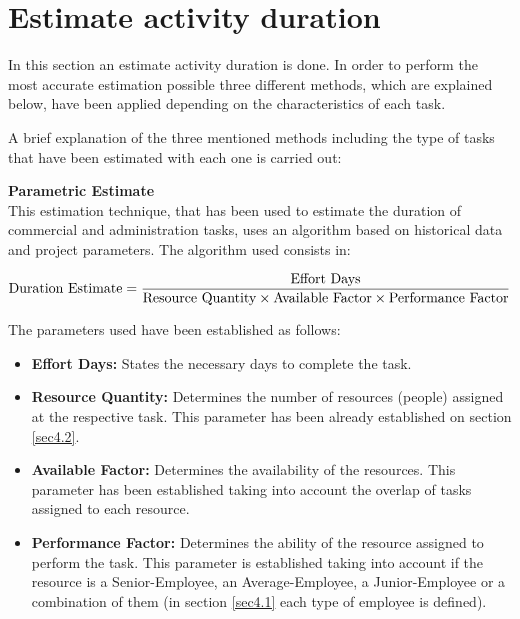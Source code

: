 \chapter{Estimate activity duration}

In this section an estimate activity duration is done. In order to perform the most accurate estimation possible three different methods, which are explained below, have been applied depending on the characteristics of each task. 

A brief explanation of the three mentioned methods including the type of tasks that have been estimated with each one is carried out:

\textbf{Parametric Estimate} \\
This estimation technique, that has been used to estimate the duration of commercial and administration tasks, uses an algorithm based on historical data and project parameters. The algorithm used consists in: 

\begin{equation}
\centering
\notag \text{Duration Estimate}=\frac{\text{Effort Days}}{\text{Resource Quantity} \times \text{Available Factor} \times \text{Performance Factor}}
\end{equation}

The parameters used have been established as follows:

\begin{itemize}
	
	\item \textbf{Effort Days:} States the necessary days to complete the task.
	
	\item \textbf{Resource Quantity:} Determines the number of resources (people) assigned at the respective task. This parameter has been already established on section \ref{sec4.2}.
	
	\item \textbf{Available Factor:} Determines the availability of the resources. This parameter has been established taking into account the overlap of tasks assigned to each resource.

	\item \textbf{Performance Factor:} Determines the ability of the resource assigned to perform the task. This parameter is established taking into account if the resource is a Senior-Employee, an Average-Employee, a Junior-Employee or a combination of them (in section \ref{sec4.1} each type of employee is defined).
	
\end{itemize} 

